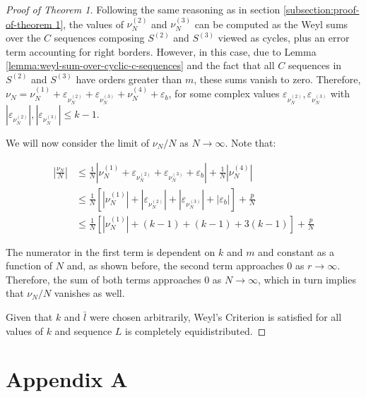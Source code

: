 \documentclass[11pt,a4paper]{tesis}
\theoremstyle{plain}
\theoremstyle{definition}
\begin{document}
\begin{proof}[Proof of Theorem 1]
  Following the same reasoning as in section \ref{subsection:proof-of-theorem 1}, the values of $\nu_N^{(2)}$ and $\nu_N^{(3)}$ can be computed as the Weyl sums over the $C$ sequences composing $S^{(2)}$ and $S^{(3)}$ viewed as cycles, plus an error term accounting for right borders. However, in this case, due to Lemma \ref{lemma:weyl-sum-over-cyclic-c-sequences} and the fact that all $C$ sequences in $S^{(2)}$ and $S^{(3)}$ have orders greater than $m$, these sums vanish to zero. Therefore, $\nu_N = \nu^{(1)}_N + \varepsilon_{\nu^{(2)}_N} + \varepsilon_{\nu^{(3)}_N} + \nu^{(4)}_N + \varepsilon_b$, for some complex values $\varepsilon_{\nu^{(2)}_N}, \varepsilon_{\nu^{(3)}_N}$ with $|\varepsilon_{\nu^{(2)}_N}|, |\varepsilon_{\nu^{(3)}_N}| \le k - 1$.

  We will now consider the limit of $\nu_N / N$ as $N \to \infty$. Note that:

  \begin{equation*}
    \begin{aligned}
      \left| \frac{\nu_N}{N} \right|
        & \le \frac{1}{N} \left| \nu^{(1)}_N + \varepsilon_{\nu^{(2)}_N} + \varepsilon_{\nu^{(3)}_N} + \varepsilon_b \right| + \frac{1}{N} \left| \nu^{(4)}_N \right| \\
        & \le \frac{1}{N} \left[ \left| \nu^{(1)}_N \right| + | \varepsilon_{\nu^{(2)}_N} | + | \varepsilon_{\nu^{(3)}_N} | + \left| \varepsilon_b \right| \right] + \frac{p}{N} \\
        & \le \frac{1}{N} \left[ \left| \nu^{(1)}_N \right| + (k - 1) + (k - 1) + 3 (k - 1) \right] + \frac{p}{N}
    \end{aligned}
  \end{equation*}

  The numerator in the first term is dependent on $k$ and $m$ and constant as a function of $N$ and, as shown before, the second term approaches $0$ as $r \to \infty$. Therefore, the sum of both terms approaches $0$ as $N \to \infty$, which in turn implies that $\nu_N / N$ vanishes as well.

  Given that $k$ and $\bar{l}$ were chosen arbitrarily, Weyl's Criterion is satisfied for all values of $k$ and sequence $L$ is completely equidistributed.

\end{proof}

\appendix

\section*{Appendix A}
\end{document}

